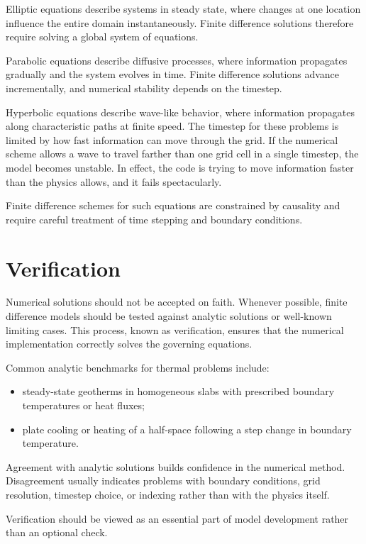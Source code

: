 Elliptic equations describe systems in steady state, where changes at one location influence the entire domain instantaneously. Finite difference solutions therefore require solving a global system of equations.

Parabolic equations describe diffusive processes, where information propagates gradually and the system evolves in time. Finite difference solutions advance incrementally, and numerical stability depends on the timestep.

Hyperbolic equations describe wave-like behavior, where information propagates along characteristic paths at finite speed.
The timestep for these problems is limited by how fast information can move through the grid. If the numerical scheme allows a wave to travel farther than one grid cell in a single timestep, the model becomes unstable. In effect, the code is trying to move information faster than the physics allows, and it fails spectacularly.

Finite difference schemes for such equations are constrained by causality and require careful treatment of time stepping and boundary conditions.

\section{Verification}

Numerical solutions should not be accepted on faith. Whenever possible, finite difference models should be tested against analytic solutions or well-known limiting cases. This process, known as verification, ensures that the numerical implementation correctly solves the governing equations.

Common analytic benchmarks for thermal problems include:
\begin{itemize}
  \item steady-state geotherms in homogeneous slabs with prescribed boundary
  temperatures or heat fluxes;
  \item plate cooling or heating of a half-space following a step change
  in boundary temperature.
\end{itemize}

Agreement with analytic solutions builds confidence in the numerical method.  Disagreement usually indicates problems with boundary conditions, grid resolution, timestep choice, or indexing rather than with the physics itself.

Verification should be viewed as an essential part of model development rather than an optional check.

